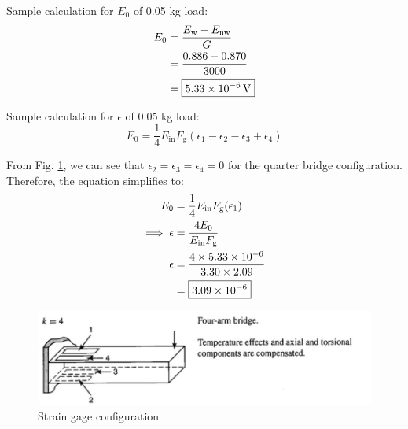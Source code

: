 Sample calculation for $E_0$ of 0.05 kg load:
\begin{align*}
    E_0 &= \frac{E_{\text{w}} - E_{\text{nw}}}{G} \\
    &= \frac{0.886 - 0.870}{3000} \\ 
    &= \boxed{\qty{5.33E-06}{\volt}}
\end{align*}

Sample calculation for $\epsilon$ of 0.05 kg load:
\begin{equation}
    E_0 = \frac{1}{4} E_{\text{in}} F_{\text{g}}
    (\epsilon_1 - \epsilon_2 - \epsilon_3 + \epsilon_4) \label{eq:epsilon}
\end{equation}

From Fig. \ref{fig:strain gage}, we can see that $\epsilon_2 = \epsilon_3 = \epsilon_4 = 0$ for the quarter bridge configuration. Therefore, the equation simplifies to:
\begin{align*}
    E_0 &= \frac{1}{4} E_{\text{in}} F_{\text{g}}
    (\epsilon_1) \\
    \implies \epsilon &= \frac{4 E_0}{E_{\text{in}} F_{\text{g}}} \\
    \epsilon &= \frac{4 \times 5.33\times 10^{-6}}{3.30 \times 2.09} \\
     &= \boxed{\qty{3.09E-06}{}}
\end{align*}


\begin{figure}[h]
    \centering
    \includegraphics[width=0.5\linewidth]{Sections/Figures/strain gage.png}
    \caption{Strain gage configuration}
    \label{fig:strain gage}
\end{figure}

